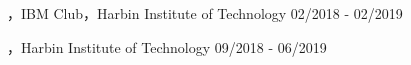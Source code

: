 
\begin{cventries}

\cvsocial
{，IBM Club，Harbin Institute of Technology}
{02/2018 - 02/2019}

\cvsocial
{，Harbin Institute of Technology}
{09/2018 - 06/2019}

\end{cventries}
